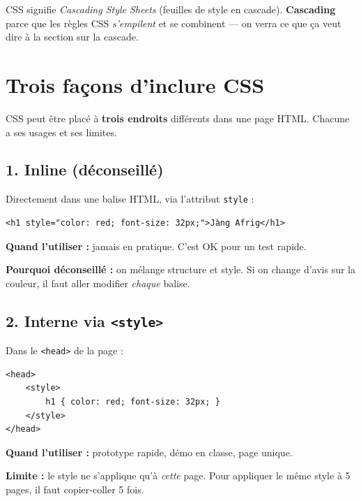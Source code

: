 \documentclass[11pt,a4paper]{article}
\begin{document}
\begin{retenirbox}[CSS = Cascading Style Sheets]
CSS signifie \textit{Cascading Style Sheets} (\og{}feuilles de style en
cascade\fg{}). \textbf{Cascading} parce que les règles CSS \emph{s'empilent}
et se combinent --- on verra ce que ça veut dire à la section sur la
cascade.
\end{retenirbox}

\newpage

\section{Trois façons d'inclure CSS}

CSS peut être placé à \textbf{trois endroits} différents dans une page
HTML. Chacune a ses usages et ses limites.

\subsection{1. Inline (déconseillé)}

Directement dans une balise HTML, via l'attribut \texttt{style} :

\begin{lstlisting}[language=HTML5]
<h1 style="color: red; font-size: 32px;">Jàng Afrig</h1>
\end{lstlisting}

\textbf{Quand l'utiliser :} jamais en pratique. C'est OK pour un test
rapide.

\textbf{Pourquoi déconseillé :} on mélange structure et style. Si on
change d'avis sur la couleur, il faut aller modifier \emph{chaque} balise.

\subsection{2. Interne via \texttt{<style>}}

Dans le \texttt{<head>} de la page :

\begin{lstlisting}[language=HTML5]
<head>
    <style>
        h1 { color: red; font-size: 32px; }
    </style>
</head>
\end{lstlisting}

\textbf{Quand l'utiliser :} prototype rapide, démo en classe, page unique.

\textbf{Limite :} le style ne s'applique qu'à \emph{cette} page. Pour
appliquer le même style à 5 pages, il faut copier-coller 5 fois.
\end{document}
